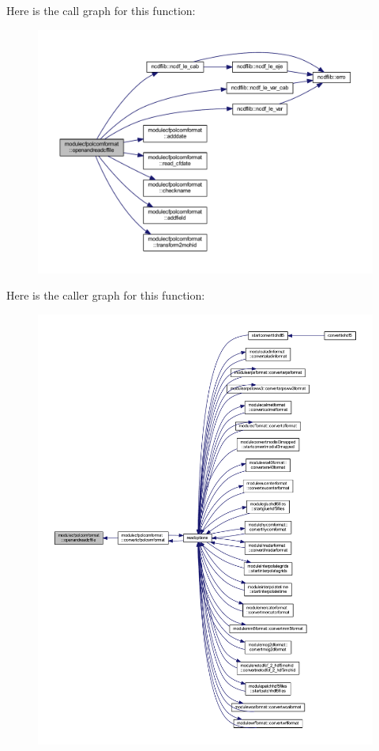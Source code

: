 Here is the call graph for this function\+:\nopagebreak
\begin{figure}[H]
\begin{center}
\leavevmode
\includegraphics[width=350pt]{namespacemodulecfpolcomformat_a4b22d491cfb2a95ce7441773203c2e7e_cgraph}
\end{center}
\end{figure}
Here is the caller graph for this function\+:\nopagebreak
\begin{figure}[H]
\begin{center}
\leavevmode
\includegraphics[width=350pt]{namespacemodulecfpolcomformat_a4b22d491cfb2a95ce7441773203c2e7e_icgraph}
\end{center}
\end{figure}
\mbox{\label{namespacemodulecfpolcomformat_a5d472a387fb496b9a4ae576e445acaa3}} 
